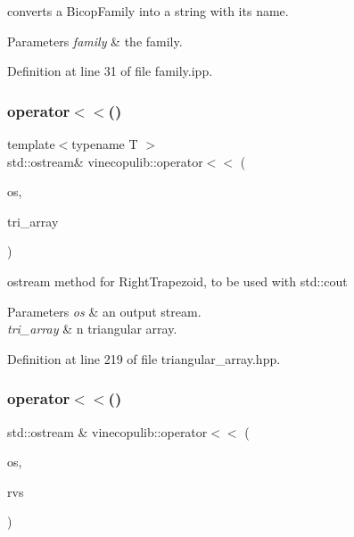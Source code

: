 converts a Bicop\+Family into a string with its name. 
\begin{DoxyParams}{Parameters}
{\em family} & the family. \\
\hline
\end{DoxyParams}


Definition at line 31 of file family.\+ipp.

\mbox{\label{namespacevinecopulib_a84bb80714f45441e76d85c7dd049db02}} 
\subsubsection{\texorpdfstring{operator$<$$<$()}{operator<<()}\hspace{0.1cm}{\footnotesize\ttfamily [1/2]}}
{\footnotesize\ttfamily template$<$typename T $>$ \\
std\+::ostream\& vinecopulib\+::operator$<$$<$ (\begin{DoxyParamCaption}\item[{std\+::ostream \&}]{os,  }\item[{const \hyperlink{classvinecopulib_1_1_triangular_array}{Triangular\+Array}$<$ T $>$ \&}]{tri\+\_\+array }\end{DoxyParamCaption})}



ostream method for Right\+Trapezoid, to be used with {\ttfamily std\+::cout} 


\begin{DoxyParams}{Parameters}
{\em os} & an output stream. \\
\hline
{\em tri\+\_\+array} & n triangular array. \\
\hline
\end{DoxyParams}


Definition at line 219 of file triangular\+\_\+array.\+hpp.

\mbox{\label{namespacevinecopulib_a903371123a404c8736f5418da502b81c}} 
\subsubsection{\texorpdfstring{operator$<$$<$()}{operator<<()}\hspace{0.1cm}{\footnotesize\ttfamily [2/2]}}
{\footnotesize\ttfamily std\+::ostream \& vinecopulib\+::operator$<$$<$ (\begin{DoxyParamCaption}\item[{std\+::ostream \&}]{os,  }\item[{const \hyperlink{classvinecopulib_1_1_r_vine_structure}{R\+Vine\+Structure} \&}]{rvs }\end{DoxyParamCaption})}



